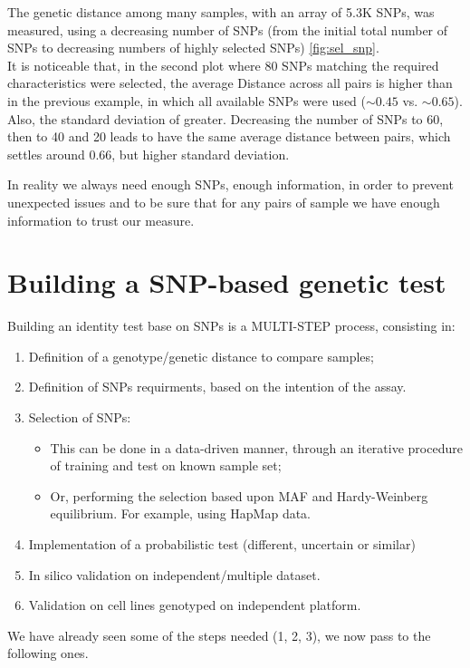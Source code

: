 The genetic distance among many samples, with an array of 5.3K SNPs, was
measured, using a decreasing number of SNPs (from the initial total number of
SNPs to decreasing numbers of highly selected SNPs) \ref{fig:sel_snp}. \\

It is noticeable that, in the second plot where 80 SNPs matching the required
characteristics were selected, the average Distance across all pairs is higher
than in the previous example, in which all available SNPs were used ($\sim 0.45$
vs. $\sim 0.65$). Also, the standard deviation of greater. Decreasing the number
of SNPs to 60, then to 40 and 20 leads to have the same average distance between
pairs, which settles around 0.66, but higher standard deviation.

In reality we always need enough SNPs, enough information, in order to prevent
unexpected issues and to be sure that for any pairs of sample we have enough
information to trust our measure. 


\section{Building a SNP-based genetic test}

Building an identity test base on SNPs is a MULTI-STEP process, consisting in: 
\begin{enumerate}
	\item Definition of a genotype/genetic distance to compare samples;
	\item Definition of SNPs requirments, based on the intention of the assay.
	\item Selection of SNPs:
	\begin{itemize}
		\item This can be done in a data-driven manner, through an iterative
		procedure of training and test on known sample set;
		\item Or, performing the selection based upon MAF and Hardy-Weinberg
		equilibrium. For example, using HapMap data.
	\end{itemize}
	\item Implementation of a probabilistic test (different, uncertain or
	similar)
	\item In silico validation on independent/multiple dataset.
	\item Validation on cell lines genotyped on independent platform. 
\end{enumerate}
We have already seen some of the steps needed (1, 2, 3), we now pass to the
following ones.


